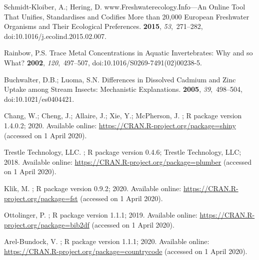 \documentclass[data,datadescriptor,accept,moreauthors,pdftex]{Definitions/mdpi}
\begin{document}
\begin{thebibliography}{999}
{Schmidt-Kloiber}, A.; Hering, D.
\newblock www.Freshwaterecology.Info---{{An}} Online Tool That
  Unifies, Standardises and Codifies More than 20,000 {{European}} Freshwater
  Organisms and Their Ecological Preferences.
 {\bf 2015}, {\em 53},~271--282, doi:10.1016/j.ecolind.2015.02.007.

Rainbow, P.S.
\newblock Trace Metal Concentrations in Aquatic Invertebrates: Why and so What?
 {\bf 2002}, {\em 120},~497--507, doi:10.1016/S0269-7491(02)00238-5.

Buchwalter, D.B.; Luoma, S.N.
\newblock Differences in {{Dissolved Cadmium}} and {{Zinc Uptake}} among
  {{Stream Insects}}: {{Mechanistic Explanations}}.
 {\bf 2005}, {\em
  39},~498--504, doi:10.1021/es0404421.

Chang, W.; Cheng, J.; Allaire, J.; Xie, Y.; McPherson, J.
; 
\newblock R package version 1.4.0.2; 2020.
\newblock Available online: \url{https://CRAN.R-project.org/package=shiny}
\newblock (accessed on 1 April 2020).

{Trestle Technology, LLC}.
;  
\newblock R package version 0.4.6; Trestle Technology, LLC; 2018.
\newblock Available online: \url{https://CRAN.R-project.org/package=plumber}
\newblock (accessed on 1 April 2020).

Klik, M.
;
\newblock R package version 0.9.2;  2020.
\newblock Available online: \url{https://CRAN.R-project.org/package=fst}
\newblock (accessed on 1 April 2020).

Ottolinger, P.
;
\newblock R package version 1.1.1;  2019.
\newblock Available online: \url{https://CRAN.R-project.org/package=bib2df}
\newblock (accessed on 1 April 2020).

Arel-Bundock, V.
;
\newblock R package version 1.1.1;  2020.
\newblock Available online: \url{https://CRAN.R-project.org/package=countrycode}
\newblock (accessed on 1 April 2020).


\end{thebibliography}
\end{document}

